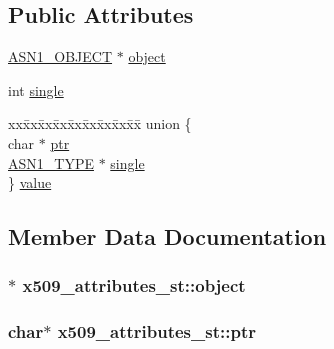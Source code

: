 \subsection*{Public Attributes}
\begin{DoxyCompactItemize}
\item 
\hyperlink{asn1_8h_ae10c08e4e6b23f67a39b2add932ec48f}{A\+S\+N1\+\_\+\+O\+B\+J\+E\+CT} $\ast$ \hyperlink{structx509__attributes__st_a646d7a1b46e88eb3b0e337e08bd08a02}{object}
\item 
int \hyperlink{structx509__attributes__st_a04dd95e9253f6b16f682e70eb5eec2ca}{single}
\item 
\begin{tabbing}
xx\=xx\=xx\=xx\=xx\=xx\=xx\=xx\=xx\=\kill
union \{\\
\>char $\ast$ \hyperlink{structx509__attributes__st_a274ad547c5114bf0b4038b7f3d8397ad}{ptr}\\
\>\hyperlink{asn1_8h_a7895e03d9fee2bc4963faf2a31a9439e}{ASN1\_TYPE} $\ast$ \hyperlink{structx509__attributes__st_a3e24cce99fbb3fcb2c689e33f9943d0b}{single}\\
\} \hyperlink{structx509__attributes__st_a331805c6cdab06ff668e8b3b0f5ad61a}{value}\\

\end{tabbing}\end{DoxyCompactItemize}


\subsection{Member Data Documentation}
\subsubsection[{\texorpdfstring{object}{object}}]{$\ast$ x509\+\_\+attributes\+\_\+st\+::object}\hypertarget{structx509__attributes__st_a646d7a1b46e88eb3b0e337e08bd08a02}{}\label{structx509__attributes__st_a646d7a1b46e88eb3b0e337e08bd08a02}
\subsubsection[{\texorpdfstring{ptr}{ptr}}]{\setlength{\rightskip}{0pt plus 5cm}char$\ast$ x509\+\_\+attributes\+\_\+st\+::ptr}\hypertarget{structx509__attributes__st_a274ad547c5114bf0b4038b7f3d8397ad}{}\label{structx509__attributes__st_a274ad547c5114bf0b4038b7f3d8397ad}
